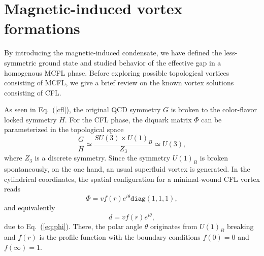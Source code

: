 \documentclass[prd, showpacs,nofootinbib,amsmath,amssymb]{revtex4}
\begin{document}
\section{Magnetic-induced vortex formations}
\label{sec:3}

By introducing the magnetic-induced condensate, we have defined the less-symmetric ground state and
studied behavior of the effective gap in a homogenous MCFL phase. Before exploring possible topological
vortices consisting of MCFL, we give a brief review on the known vortex solutions consisting of CFL.

As seen in Eq.~(\ref{cfl}), the original QCD symmetry $G$ is broken to
the color-flavor locked symmetry $H$.
For the CFL phase, the diquark matrix $\Phi$ can be parameterized in the
topological space
\begin{equation}
  \label{eq:cflvortexgroup}
  \frac{G}{H} \simeq \frac{SU(3) \times U(1)_B}{Z_3}  \simeq U(3),
\end{equation}
where $Z_3$ is a discrete symmetry.
Since the symmetry $U(1)_B$ is broken spontaneously, on the one hand, an usual superfluid vortex is generated.
In the cylindrical coordinates, the spatial configuration for a minimal-wound CFL vortex reads
\begin{equation}
  \label{eq:bvortexphi}
\Phi =vf(r)e^{i \theta} \texttt{diag}(1,1,1),
\end{equation}
and equivalently
\begin{equation}
 d = vf(r)e^{i\theta}, \label{eq:bvortex}\end{equation}
due to Eq.~(\ref{eq:phi}). There, the polar angle $\theta$ originates from $U(1)_B$ breaking and
$f(r)$ is the profile function with the boundary
conditions $f(0) = 0$ and $f(\infty) =1$.
\end{document}
